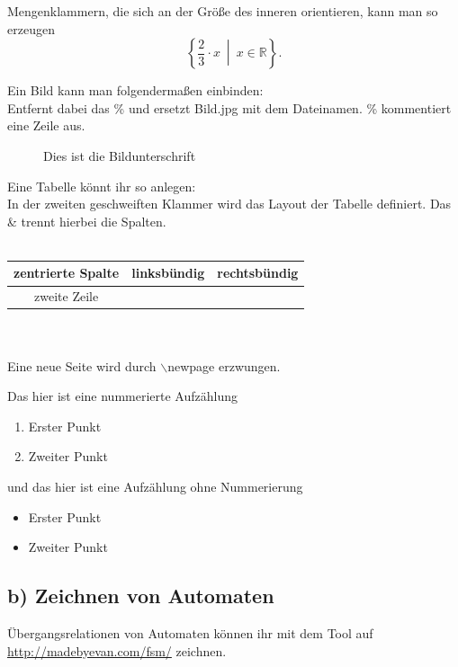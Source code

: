 \documentclass[a4paper]{scrartcl}
\begin{document}
Mengenklammern, die sich an der Größe des inneren orientieren, kann man so erzeugen
\[\left\{ \frac{2}{3} \cdot x \ \middle| \ x \in \mathbb{R} \right\} .\]


Ein Bild kann man folgendermaßen einbinden: \\
Entfernt dabei das \% und ersetzt Bild.jpg mit dem Dateinamen. \% kommentiert eine Zeile aus.

\begin{figure}[H]
\centering
\caption{Dies ist die Bildunterschrift}
\end{figure}

Eine Tabelle könnt ihr so anlegen:\\
In der zweiten geschweiften Klammer wird das Layout der Tabelle definiert. Das \& trennt hierbei die Spalten.\\
\ \\ %
\begin{tabular}{c|lr}
  zentrierte Spalte & linksbündig & rechtsbündig\\
  \hline
  zweite Zeile & \\
\end{tabular}\\
\ \\
Eine neue Seite wird durch $\backslash$newpage erzwungen.
\newpage

Das hier ist eine nummerierte Aufzählung
\begin{enumerate}
\item Erster Punkt
\item Zweiter Punkt
\end{enumerate}

und das hier ist eine Aufzählung ohne Nummerierung
\begin{itemize}
\item Erster Punkt
\item Zweiter Punkt
\end{itemize}

\subsection*{b) Zeichnen von Automaten}

Übergangsrelationen von Automaten können ihr mit dem Tool auf \url{http://madebyevan.com/fsm/} zeichnen. 
\end{document}
